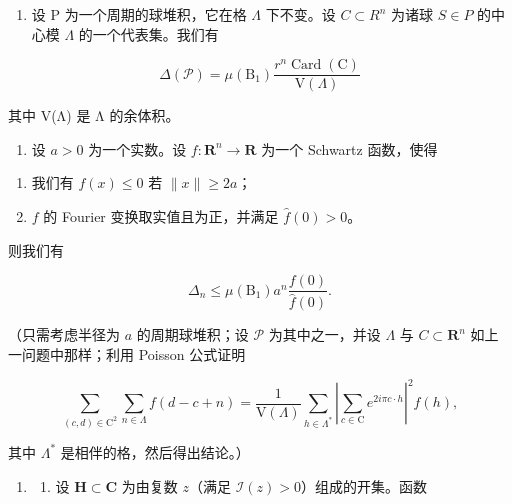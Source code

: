 \begin{enumerate}
\def\labelenumi{\alph{enumi})}
\setcounter{enumi}{1}
\tightlist
\item
  设 P 为一个周期的球堆积，它在格 \(\Lambda\) 下不变。设 \(C \subset R^{n}\) 为诸球 \(S \in P\) 的中心模 \(\Lambda\) 的一个代表集。我们有
\end{enumerate}

\[
\Delta (\mathcal {P}) = \mu (\mathrm{B} _ {1}) \frac {r ^ {n} \operatorname{Card} (\mathrm{C})}{\mathrm{V} (\Lambda)}
\]

其中 V(Λ) 是 Λ 的余体积。

\begin{enumerate}
\def\labelenumi{\alph{enumi})}
\setcounter{enumi}{2}
\tightlist
\item
  设 \(a > 0\) 为一个实数。设 \(f: \mathbf{R}^{n} \to \mathbf{R}\) 为一个 Schwartz 函数，使得
\end{enumerate}

\begin{enumerate}
\def\labelenumi{(\roman{enumi})}
\item
  我们有 \(f(x) \leqslant 0 \text{ 若 } \|x\| \geqslant 2a\)；
\item
  \(f\) 的 Fourier 变换取实值且为正，并满足 \(\widehat{f}(0)>0\)。
\end{enumerate}

则我们有

\[
\Delta_ {n} \leqslant \mu (\mathrm{B} _ {1}) a ^ {n} \frac {f (0)}{\widehat {f} (0)}.
\]

（只需考虑半径为 \(a\) 的周期球堆积；设 \(\mathcal{P}\) 为其中之一，并设 \(\Lambda\) 与 \(C \subset \mathbf{R}^n\) 如上一问题中那样；利用 Poisson 公式证明

\[
\sum_ {(c, d) \in \mathrm{C} ^ {2}} \sum_ {n \in \Lambda} f (d - c + n) = \frac {1}{\mathrm{V} (\Lambda)} \sum_ {h \in \Lambda^ {*}} \left| \sum_ {c \in \mathrm{C}} e ^ {2 i \pi c \cdot h} \right| ^ {2} \widehat {f} (h),
\]

其中 \(\Lambda^{*}\) 是相伴的格，然后得出结论。）

\begin{enumerate}
\def\labelenumi{\arabic{enumi})}
\setcounter{enumi}{59}
\tightlist
\item
  \begin{enumerate}
  \def\labelenumii{\alph{enumii})}
  \tightlist
  \item
    设 \(\mathbf{H} \subset \mathbf{C}\) 为由复数 \(z\)（满足 \(\mathcal{I}(z) > 0\)）组成的开集。函数
  \end{enumerate}
\end{enumerate}

